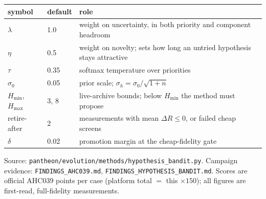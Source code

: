 \documentclass[11pt]{article}
\begin{document}
\begin{center}
\begin{tabular}{llp{72mm}}
\toprule
symbol & default & role \\
\midrule
$\lambda$   & 1.0  & weight on uncertainty, in both priority and component headroom \\
$\eta$      & 0.5  & weight on novelty; sets how long an untried hypothesis stays attractive \\
$\tau$      & 0.35 & softmax temperature over priorities \\
$\sigma_0$  & 0.05 & prior scale; $\sigma_h = \sigma_0/\sqrt{1+n}$ \\
$H_{\min}$, $H_{\max}$ & 3, 8 & live-archive bounds; below $H_{\min}$ the method must propose \\
retire-after & 2 & measurements with mean $\Delta R \le 0$, or failed cheap screens \\
$\delta$    & 0.02 & promotion margin at the cheap-fidelity gate \\
\bottomrule
\end{tabular}
\end{center}

\vfill
\noindent\footnotesize Source: \texttt{pantheon/evolution/methods/hypothesis\_bandit.py}.
Campaign evidence: \texttt{FINDINGS\_AHC039.md}, \texttt{FINDINGS\_HYPOTHESIS\_BANDIT.md}.
Scores are official AHC039 points per case (platform total $=$ this $\times 150$); all figures are
first-read, full-fidelity measurements.
\end{document}

